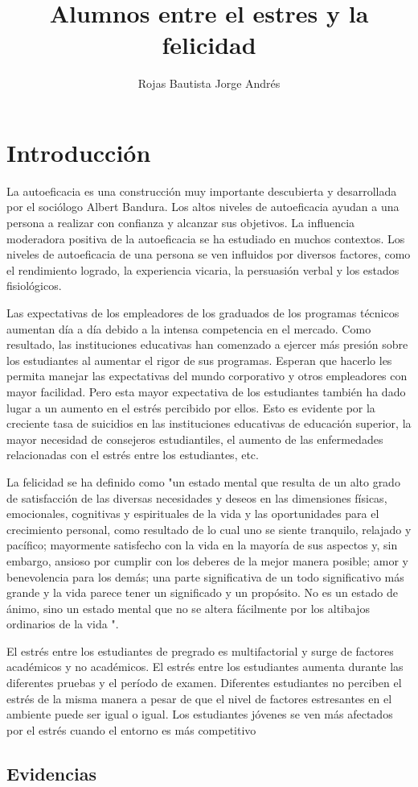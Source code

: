\documentclass[jou,apacite]{apa6}
\title{Alumnos entre el estres y la felicidad}
\author{Rojas Bautista Jorge Andrés}
\affiliation{Universidad Distrital Francisco Jose de Caldas}
\begin{document}
\maketitle    
                        
\section{Introducción}
La autoeficacia es una construcción muy importante descubierta y desarrollada por el sociólogo Albert Bandura. Los altos niveles de autoeficacia ayudan a una persona a realizar con confianza y alcanzar sus objetivos. La influencia moderadora positiva de la autoeficacia se ha estudiado en muchos contextos. Los niveles de autoeficacia de una persona se ven influidos por diversos factores, como el rendimiento logrado, la experiencia vicaria, la persuasión verbal y los estados fisiológicos.~\cite{Andura}

Las expectativas de los empleadores de los graduados de los programas técnicos aumentan día a día debido a la intensa competencia en el mercado. Como resultado, las instituciones educativas han comenzado a ejercer más presión sobre los estudiantes al aumentar el rigor de sus programas. Esperan que hacerlo les permita manejar las expectativas del mundo corporativo y otros empleadores con mayor facilidad. Pero esta mayor expectativa de los estudiantes también ha dado lugar a un aumento en el estrés percibido por ellos. Esto es evidente por la creciente tasa de suicidios en las instituciones educativas de educación superior, la mayor necesidad de consejeros estudiantiles, el aumento de las enfermedades relacionadas con el estrés entre los estudiantes, etc.

La felicidad se ha definido como "un estado mental que resulta de un alto grado de satisfacción de las diversas necesidades y deseos en las dimensiones físicas, emocionales, cognitivas y espirituales de la vida y las oportunidades para el crecimiento personal, como resultado de lo cual uno se siente tranquilo, relajado y pacífico; mayormente satisfecho con la vida en la mayoría de sus aspectos y, sin embargo, ansioso por cumplir con los deberes de la mejor manera posible; amor y benevolencia para los demás; una parte significativa de un todo significativo más grande y la vida parece tener un significado y un propósito. No es un estado de ánimo, sino un estado mental que no se altera fácilmente por los altibajos ordinarios de la vida ".~\cite{Prasad}

El estrés entre los estudiantes de pregrado es multifactorial y surge de factores académicos y no académicos. El estrés entre los estudiantes aumenta durante las diferentes pruebas y el período de examen. Diferentes estudiantes no perciben el estrés de la misma manera a pesar de que el nivel de factores estresantes en el ambiente puede ser igual o igual. Los estudiantes jóvenes se ven más afectados por el estrés cuando el entorno es más competitivo~\cite{Brand}


\subsection{Evidencias}



\end{document}
